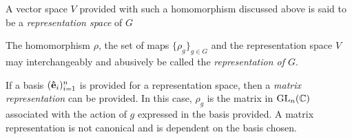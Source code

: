 \begin{notation}
	A vector space $V$ provided with such a homomorphism discussed above is said to be a \textit{representation space} of $G$%
\end{notation}

\begin{note}
	The homomorphism $\rho$, the set of maps $\{\rho_g\}_{g \in G}$ and the representation space $V$ may interchangeably and abusively be called the \textit{representation of $G$}.
\end{note}


If a basis $(\mathbf{\hat{e}}_i)_{i=1}^n$ is provided for a representation space, then a \textit{matrix representation} can be provided. In this case, $\rho_g$ is the matrix in $\text{GL}_n(\mathbb{C})$ associated with the action of $g$ expressed in the basis provided. A matrix representation is not canonical and is dependent on the basis chosen.
